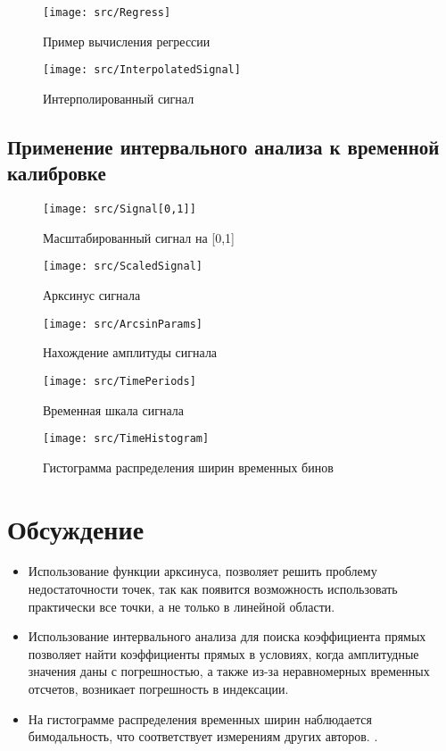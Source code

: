 \documentclass[a4paper]{article}
\begin{document}
    \begin{figure}[H]
            \centering
            \texttt{[image: src/Regress]}
            \caption{Пример вычисления регрессии}
        \end{figure}

    \begin{figure}[H]
        \centering
        \texttt{[image: src/InterpolatedSignal]}
        \caption{Интерполированный сигнал}
    \end{figure}
    \subsection{Применение интервального анализа к временной калибровке}
        \begin{figure}[H]
            \centering
            \texttt{[image: src/Signal[0,1]]}
            \caption{Масштабированный сигнал на [0,1]}
        \end{figure}
        \begin{figure}[H]
                \centering
                \texttt{[image: src/ScaledSignal]}
            \caption{Арксинус сигнала}
        \end{figure}

        \begin{figure}[H]
            \centering
            \texttt{[image: src/ArcsinParams]}
            \caption{Нахождение амплитуды сигнала}
        \end{figure}

        \begin{figure}[H]
            \centering
            \texttt{[image: src/TimePeriods]}
            \caption{Временная шкала сигнала}
        \end{figure}

        \begin{figure}[H]
            \centering
            \texttt{[image: src/TimeHistogram]}
            \caption{Гистограмма распределения ширин временных бинов}
        \end{figure}

\section{Обсуждение}
    \begin{itemize}
        \item Использование функции арксинуса, позволяет решить проблему недостаточности точек, так как появится возможность использовать
              практически все точки, а не только в линейной области.
        \item Использование интервального анализа для поиска коэффициента прямых позволяет найти коэффициенты прямых в
              условиях, когда амплитудные значения даны с погрешностью, а также из-за неравномерных временных отсчетов,
              возникает погрешность в индексации.
        \item На гистограмме распределения временных ширин наблюдается бимодальность, что соответствует
              измерениям других авторов. \cite{VKR}.
    \end{itemize}
\end{document}
